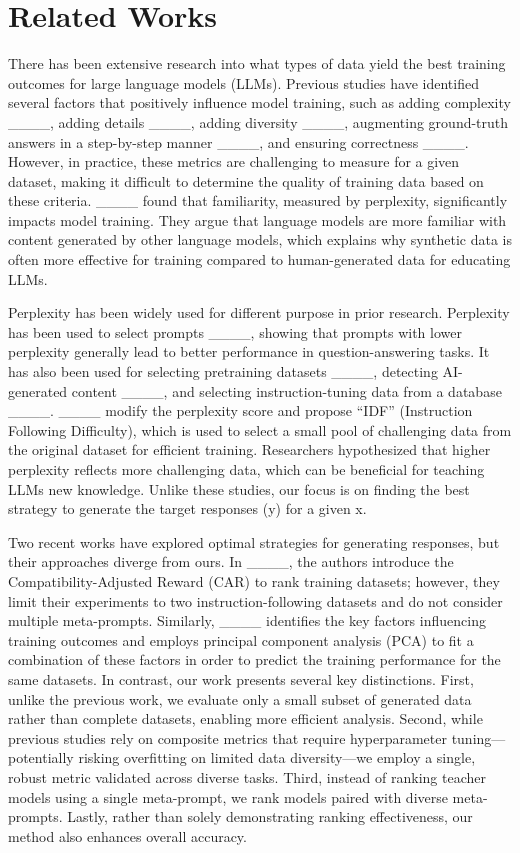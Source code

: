 \section{Related Works}
% 
There has been extensive research into what types of data yield the best training outcomes for large language models (LLMs). Previous studies have identified several factors that positively influence model training, such as adding complexity ____, adding details ____, adding diversity ____, augmenting ground-truth answers in a step-by-step manner ____, and ensuring correctness ____. However, in practice, these metrics are challenging to measure for a given dataset, making it difficult to determine the quality of training data based on these criteria. ____ found that familiarity, measured by perplexity, significantly impacts model training. They argue that language models are more familiar with content generated by other language models, which explains why synthetic data is often more effective for training compared to human-generated data for educating LLMs. 

Perplexity has been widely used for different purpose in prior research. Perplexity has been used to select prompts ____, showing that prompts with lower perplexity generally lead to better performance in question-answering tasks. It has also been used for selecting pretraining datasets ____, detecting AI-generated content ____, and selecting instruction-tuning data from a database ____. ____ modify the perplexity score and propose “IDF” (Instruction Following Difficulty), which is used to select a small pool of challenging data from the original dataset for efficient training. Researchers hypothesized that higher perplexity reflects more challenging data, which can be beneficial for teaching LLMs new knowledge. Unlike these studies, our focus is on finding the best strategy to generate the target responses (y) for a given x.  

Two recent works have explored optimal strategies for generating responses, but their approaches diverge from ours. In ____, the authors introduce the Compatibility-Adjusted Reward (CAR) to rank training datasets; however, they limit their experiments to two instruction-following datasets and do not consider multiple meta-prompts. Similarly, ____ identifies the key factors influencing training outcomes and employs principal component analysis (PCA) to fit a combination of these factors in order to predict the training performance for the same datasets. In contrast, our work presents several key distinctions. First, unlike the previous work, we evaluate only a small subset of generated data rather than complete datasets, enabling more efficient analysis. Second, while previous studies rely on composite metrics that require hyperparameter tuning—potentially risking overfitting on limited data diversity—we employ a single, robust metric validated across diverse tasks. Third, instead of ranking teacher models using a single meta-prompt, we rank models paired with diverse meta-prompts. Lastly, rather than solely demonstrating ranking effectiveness, our method also enhances overall accuracy.